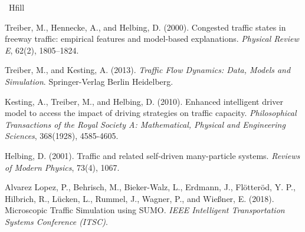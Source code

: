 \documentclass[12pt, a4paper]{article}
\begin{document}
\ Hfill\break %
\begin{thebibliography}{9}
    Treiber, M., Hennecke, A., and Helbing, D. (2000).
    Congested traffic states in freeway traffic: empirical features and model-based explanations.
    \textit{Physical Review E}, 62(2), 1805--1824.

    Treiber, M., and Kesting, A. (2013).
    \textit{Traffic Flow Dynamics: Data, Models and Simulation}.
    Springer-Verlag Berlin Heidelberg.
    
    Kesting, A., Treiber, M., and Helbing, D. (2010). 
    Enhanced intelligent driver model to access the impact of driving strategies on traffic capacity. 
    \textit{Philosophical Transactions of the Royal Society A: Mathematical, Physical and Engineering Sciences}, 368(1928), 4585-4605.

    Helbing, D. (2001). 
    Traffic and related self-driven many-particle systems. 
    \textit{Reviews of Modern Physics}, 73(4), 1067.

    Alvarez Lopez, P., Behrisch, M., Bieker-Walz, L., Erdmann, J., Flötteröd, Y. P., Hilbrich, R., Lücken, L., Rummel, J., Wagner, P., and Wießner, E. (2018).
    Microscopic Traffic Simulation using SUMO.
    \textit{IEEE Intelligent Transportation Systems Conference (ITSC)}.

\end{thebibliography}
\end{document}
